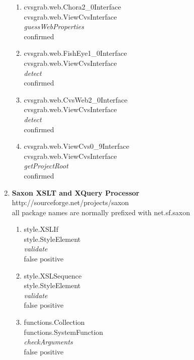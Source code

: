 \documentclass{acm_proc_article-sp}
\begin{document}
\begin{enumerate}
\begin{enumerate}
     \item cvsgrab.web.Chora2\_0Interface \\
     cvsgrab.web.ViewCvsInterface \\
     \emph{guessWebProperties}\\
     confirmed
     
     \item cvsgrab.web.FishEye1\_0Interface \\
     cvsgrab.web.ViewCvsInterface\\ 
     \emph{detect}\\
     confirmed
     
     \item cvsgrab.web.CvsWeb2\_0Interface\\
     cvsgrab.web.ViewCvsInterface\\
     \emph{detect}\\
     confirmed
     
     \item cvsgrab.web.ViewCvs0\_9Interface\\ 
     cvsgrab.web.ViewCvsInterface\\ 
     \emph{getProjectRoot}\\
     confirmed
  \end{enumerate}
  
\item \textbf{Saxon XSLT and XQuery Processor}\\
   http://sourceforge.net/projects/saxon\\
  all package names are normally prefixed with net.sf.saxon
  \begin{enumerate}
    \item style.XSLIf\\
    style.StyleElement\\
    \emph{validate}\\
    false positive
   
     \item style.XSLSequence \\
     style.StyleElement\\
     \emph{validate}\\
     false positive
   
     \item functions.Collection \\
     functions.SystemFunction\\
     \emph{checkArguments}\\
     false positive
   

\end{enumerate}
\end{enumerate}
\end{document}
